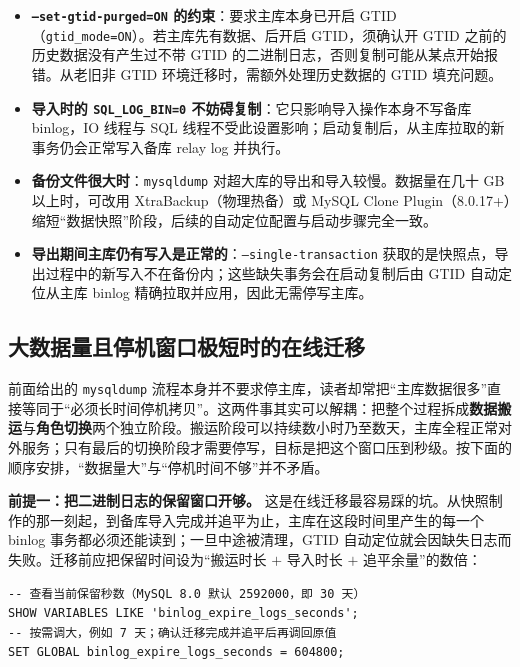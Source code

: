 \documentclass[12pt,UTF8]{ctexbook}
\begin{document}
\begin{itemize}[leftmargin=2cm]
  \item \textbf{\texttt{--set-gtid-purged=ON} 的约束}：要求主库本身已开启 GTID（\texttt{gtid\_mode=ON}）。若主库先有数据、后开启 GTID，须确认开 GTID 之前的历史数据没有产生过不带 GTID 的二进制日志，否则复制可能从某点开始报错。从老旧非 GTID 环境迁移时，需额外处理历史数据的 GTID 填充问题。
  \item \textbf{导入时的 \texttt{SQL\_LOG\_BIN=0} 不妨碍复制}：它只影响导入操作本身不写备库 binlog，IO 线程与 SQL 线程不受此设置影响；启动复制后，从主库拉取的新事务仍会正常写入备库 relay log 并执行。
  \item \textbf{备份文件很大时}：\texttt{mysqldump} 对超大库的导出和导入较慢。数据量在几十 GB 以上时，可改用 XtraBackup（物理热备）或 MySQL Clone Plugin（8.0.17+）缩短“数据快照”阶段，后续的自动定位配置与启动步骤完全一致。
  \item \textbf{导出期间主库仍有写入是正常的}：\texttt{--single-transaction} 获取的是快照点，导出过程中的新写入不在备份内；这些缺失事务会在启动复制后由 GTID 自动定位从主库 binlog 精确拉取并应用，因此无需停写主库。
\end{itemize}

\subsection{大数据量且停机窗口极短时的在线迁移}

前面给出的 \texttt{mysqldump} 流程本身并不要求停主库，读者却常把“主库数据很多”直接等同于“必须长时间停机拷贝”。这两件事其实可以解耦：把整个过程拆成\textbf{数据搬运}与\textbf{角色切换}两个独立阶段。搬运阶段可以持续数小时乃至数天，主库全程正常对外服务；只有最后的切换阶段才需要停写，目标是把这个窗口压到秒级。按下面的顺序安排，“数据量大”与“停机时间不够”并不矛盾。

\textbf{前提一：把二进制日志的保留窗口开够。} 这是在线迁移最容易踩的坑。从快照制作的那一刻起，到备库导入完成并追平为止，主库在这段时间里产生的每一个 binlog 事务都必须还能读到；一旦中途被清理，GTID 自动定位就会因缺失日志而失败。迁移前应把保留时间设为“搬运时长 \(+\) 导入时长 \(+\) 追平余量”的数倍：

\begin{lstlisting}
-- 查看当前保留秒数（MySQL 8.0 默认 2592000，即 30 天）
SHOW VARIABLES LIKE 'binlog_expire_logs_seconds';
-- 按需调大，例如 7 天；确认迁移完成并追平后再调回原值
SET GLOBAL binlog_expire_logs_seconds = 604800;
\end{lstlisting}
\end{document}
